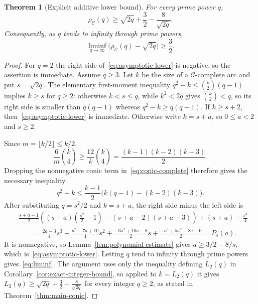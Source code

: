 \documentclass[11pt]{article}
\newtheorem{theorem}{Theorem}[section]
\theoremstyle{definition}
\theoremstyle{remark}
\newcommand{\cC}{\mathcal{C}}
\newcommand{\rhoC}{\rho_{\cC}}
\begin{document}
\begin{theorem}[Explicit additive lower bound]
\label{thm:asymptotic}
For every prime power $q$,
\begin{equation}
 \boxed{\displaystyle
 \rhoC(q)\ge\sqrt{2q}+\frac32-\frac8{\sqrt{2q}}.}
\label{eq:asymptotic-lower}
\end{equation}
Consequently, as $q$ tends to infinity through prime powers,
\begin{equation}
 \liminf_{q\to\infty}
 \bigl(\rhoC(q)-\sqrt{2q}\bigr)\ge\frac32.
\label{eq:liminf}
\end{equation}
\end{theorem}

\begin{proof}
For \(q=2\) the right side of~\eqref{eq:asymptotic-lower} is negative, so
the assertion is immediate.  Assume \(q\ge3\).
Let $k$ be the size of a $\cC$-complete arc and put $s=\sqrt{2q}$.
The elementary first-moment inequality
$q^2-k\le\binom{k}{2}(q-1)$ implies $k\ge s$ for $q\ge2$:
otherwise $k<s\le q$, while $k^2<2q$ gives
$\binom{k}{2}<q$, so its right side is smaller than $q(q-1)$ whereas
$q^2-k\ge q(q-1)$.
If $k\ge s+2$, then~\eqref{eq:asymptotic-lower} is immediate.  Otherwise
write $k=s+a$, so $0\le a<2$ and $s\ge2$.

Since $m=\lfloor k/2\rfloor\le k/2$,
\[
 \frac6m\binom{k}{4}
 \ge\frac{12}{k}\binom{k}{4}
 =\frac{(k-1)(k-2)(k-3)}2.
\]
Dropping the nonnegative conic term in~\eqref{eq:conic-complete} therefore
gives the necessary inequality
\[
 q^2-k\le
 \frac{k-1}{2}\bigl(k(q-1)-(k-2)(k-3)\bigr).
\]
After substituting $q=s^2/2$ and $k=s+a$, the right side minus the left
side is
\begin{align*}
&\frac{s+a-1}{2}
 \left((s+a)\left(\frac{s^2}{2}-1\right)
 -(s+a-2)(s+a-3)\right)
 +(s+a)-\frac{s^4}{4}\\
&\qquad=
 \frac{2a-3}{4}s^3
 +\frac{a^2-7a+10}{4}s^2
 +\frac{-3a^2+10a-8}{2}s
 +\frac{-a^3+5a^2-8a+6}{2}
 =P_s(a).
\end{align*}
It is nonnegative, so
Lemma~\ref{lem:polynomial-estimate} gives
$a\ge3/2-8/s$, which is~\eqref{eq:asymptotic-lower}.  Letting $q$ tend to
infinity through prime powers gives~\eqref{eq:liminf}.  The argument uses
only the inequality defining \(L_2(q)\) in
Corollary~\ref{cor:exact-integer-bound}, so applied to \(k=L_2(q)\) it
gives \(L_2(q)\ge\sqrt{2q}+\frac32-\frac8{\sqrt{2q}}\) for every integer
\(q\ge2\), as stated in Theorem~\ref{thm:main-conic}.
\end{proof}
\end{document}
